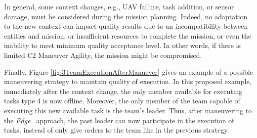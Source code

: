 In general, some context changes, e.g., UAV failure, task addition, or sensor damage, must be considered during the mission planning. Indeed, no adaptation to the new context can impact quality results due to an incompatibility between entities and mission, or insufficient resources to complete the mission, or even the inability to meet minimum quality acceptance level. In other words, if there is limited C2 Maneuver Agility, the mission might be compromised.

Finally, Figure \ref{fig:3TeamExecutionAfterManuever} gives an example of a possible maneuvering strategy to maintain quality of execution. In this proposed example, immediately after the context change, the only member available for executing tasks type 4 is now offline. Moreover, the only member of the team capable of executing this new available task is the team's leader. Thus, after maneuvering to the \textit{Edge}~\citep{france2014} approach, the past leader can now participate in the execution of tasks, instead of only give orders to the team like in the previous strategy.

\begin{figure}[ht]
    \centering
\end{figure}